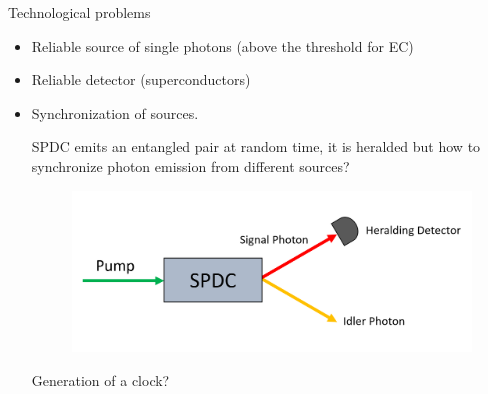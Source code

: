 \documentclass{beamer}
\begin{document}
\begin{frame}{Technological problems}
\begin{center}
\begin{itemize}
\item Reliable source of single photons (above the threshold for EC)
\item Reliable detector (superconductors)
\item Synchronization of sources.

SPDC emits an entangled pair at random time, it is heralded but how to synchronize photon emission from different sources? 

\begin{figure}[!htb]
\centering
\includegraphics[scale=.20]{immagini/spdc.png}
\end{figure}

Generation of a clock?
\end{itemize}

\end{center}
\end{frame}
\end{document}
